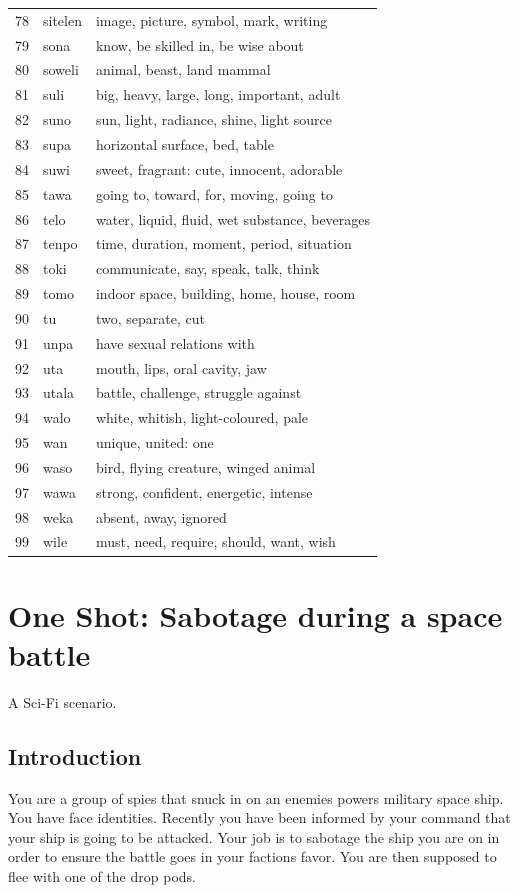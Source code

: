 \documentclass[11pt]{article}
\begin{document}
{\begin{multicols}{2}[]
\begin{center}
\begin{tabularx}{\linewidth}{rlX}
78 & sitelen & image, picture, symbol, mark, writing\\
79 & sona & know, be skilled in, be wise about\\
80 & soweli & animal, beast, land mammal\\
81 & suli & big, heavy, large, long, important, adult\\
82 & suno & sun, light, radiance, shine, light source\\
83 & supa & horizontal surface, bed, table\\
84 & suwi & sweet, fragrant: cute, innocent, adorable\\
85 & tawa & going to, toward, for, moving, going to\\
86 & telo & water, liquid, fluid, wet substance, beverages\\
87 & tenpo & time, duration, moment, period, situation\\
88 & toki & communicate, say, speak, talk, think\\
89 & tomo & indoor space, building, home, house, room\\
90 & tu & two, separate, cut\\
91 & unpa & have sexual relations with\\
92 & uta & mouth, lips, oral cavity, jaw\\
93 & utala & battle, challenge, struggle against\\
94 & walo & white, whitish, light-coloured, pale\\
95 & wan & unique, united: one\\
96 & waso & bird, flying creature, winged animal\\
97 & wawa & strong, confident, energetic, intense\\
98 & weka & absent, away, ignored\\
99 & wile & must, need, require, should, want, wish\\
\end{tabularx}
\end{center}
\end{multicols}
\normalsize
\section{One Shot: Sabotage during a space battle}
\label{sec:org50de74f}

A Sci-Fi scenario.
\subsection{Introduction}
\label{sec:org84d72ba}
You are a group of spies that snuck in on an enemies powers military space ship. You have face identities. Recently you have been informed by your command that your ship is going to be attacked. Your job is to sabotage the ship you are on in order to ensure the battle goes in your factions favor. You are then supposed to flee with one of the drop pods.
}
\end{document}
